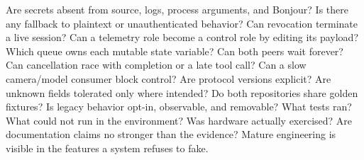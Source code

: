 \markdownRendererUlItem Are secrets absent from source, logs, process arguments, and Bonjour?\markdownRendererUlItemEnd 
\markdownRendererUlItem Is there any fallback to plaintext or unauthenticated behavior?\markdownRendererUlItemEnd 
\markdownRendererUlItem Can revocation terminate a live session?\markdownRendererUlItemEnd 
\markdownRendererUlItem Can a telemetry role become a control role by editing its payload?\markdownRendererUlItemEnd 
\markdownRendererUlEnd \markdownRendererInterblockSeparator
{}
\markdownRendererSectionEnd \markdownRendererSectionBegin
{}\markdownRendererInterblockSeparator
{}\markdownRendererUlBegin
\markdownRendererUlItem Which queue owns each mutable state variable?\markdownRendererUlItemEnd 
\markdownRendererUlItem Can both peers wait forever?\markdownRendererUlItemEnd 
\markdownRendererUlItem Can cancellation race with completion or a late tool call?\markdownRendererUlItemEnd 
\markdownRendererUlItem Can a slow camera/model consumer block control?\markdownRendererUlItemEnd 
\markdownRendererUlEnd \markdownRendererInterblockSeparator
{}
\markdownRendererSectionEnd \markdownRendererSectionBegin
{}\markdownRendererInterblockSeparator
{}\markdownRendererUlBegin
\markdownRendererUlItem Are protocol versions explicit?\markdownRendererUlItemEnd 
\markdownRendererUlItem Are unknown fields tolerated only where intended?\markdownRendererUlItemEnd 
\markdownRendererUlItem Do both repositories share golden fixtures?\markdownRendererUlItemEnd 
\markdownRendererUlItem Is legacy behavior opt-in, observable, and removable?\markdownRendererUlItemEnd 
\markdownRendererUlEnd \markdownRendererInterblockSeparator
{}
\markdownRendererSectionEnd \markdownRendererSectionBegin
{}\markdownRendererInterblockSeparator
{}\markdownRendererUlBegin
\markdownRendererUlItem What tests ran?\markdownRendererUlItemEnd 
\markdownRendererUlItem What could not run in the environment?\markdownRendererUlItemEnd 
\markdownRendererUlItem Was hardware actually exercised?\markdownRendererUlItemEnd 
\markdownRendererUlItem Are documentation claims no stronger than the evidence?\markdownRendererUlItemEnd 
\markdownRendererUlEnd \markdownRendererInterblockSeparator
{}\markdownRendererThematicBreak{}\markdownRendererInterblockSeparator
{}
\markdownRendererSectionEnd 
\markdownRendererSectionEnd \markdownRendererSectionBegin
{}\markdownRendererInterblockSeparator
{}Mature engineering is visible in the features a system refuses to fake.\markdownRendererSoftLineBreak
